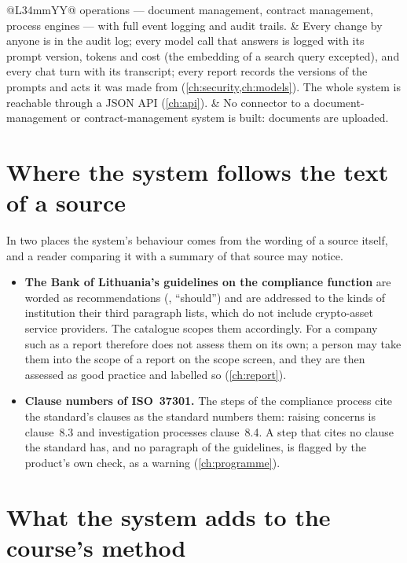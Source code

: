 \begin{xltabular}{\textwidth}{@{}L{34mm}YY@{}}
  operations --- document management, contract management, process engines --- with full
  event logging and audit trails. &
  Every change by anyone is in the audit log; every model call that answers is logged with
  its prompt version, tokens and cost (the embedding of a search query excepted), and every
  chat turn with its transcript; every report records
  the versions of the prompts and acts it was made from (\cref{ch:security,ch:models}). The
  whole system is reachable through a JSON API (\cref{ch:api}). &
  No connector to a document-management or contract-management system is built: documents
  are uploaded. \\
\end{xltabular}

\section{Where the system follows the text of a source}\label{sec:course:sources}

In two places the system's behaviour comes from the wording of a source itself, and a reader
comparing it with a summary of that source may notice.

\begin{itemize}
  \item \textbf{The Bank of Lithuania's guidelines on the compliance function} are worded as
    recommendations (, \enquote{should}) and are addressed to the kinds of
    institution their third paragraph lists, which do not include crypto-asset service
    providers. The catalogue scopes them accordingly. For a company such as \demo{} a report
    therefore does not assess them on its own; a person may take them into the scope of a
    report on the scope screen, and they are then assessed as good practice and labelled so
    (\cref{ch:report}).
  \item \textbf{Clause numbers of ISO~37301.} The steps of the compliance process cite the
    standard's clauses as the standard numbers them: raising concerns is clause~8.3 and
    investigation processes clause~8.4. A step that cites no clause the standard has, and no
    paragraph of the guidelines, is flagged by the product's own check, as a warning
    (\cref{ch:programme}).
\end{itemize}

\section{What the system adds to the course's method}\label{sec:course:adds}

